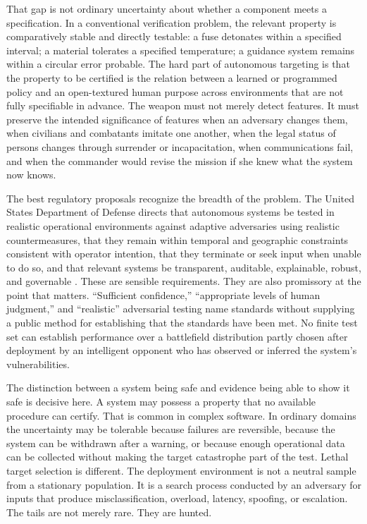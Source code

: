 \documentclass[11pt]{article}
\begin{document}
That gap is not ordinary uncertainty about whether a component meets a specification. In a conventional verification problem, the relevant property is comparatively stable and directly testable: a fuse detonates within a specified interval; a material tolerates a specified temperature; a guidance system remains within a circular error probable. The hard part of autonomous targeting is that the property to be certified is the relation between a learned or programmed policy and an open-textured human purpose across environments that are not fully specifiable in advance. The weapon must not merely detect features. It must preserve the intended significance of features when an adversary changes them, when civilians and combatants imitate one another, when the legal status of persons changes through surrender or incapacitation, when communications fail, and when the commander would revise the mission if she knew what the system now knows.

The best regulatory proposals recognize the breadth of the problem. The United States Department of Defense directs that autonomous systems be tested in realistic operational environments against adaptive adversaries using realistic countermeasures, that they remain within temporal and geographic constraints consistent with operator intention, that they terminate or seek input when unable to do so, and that relevant systems be transparent, auditable, explainable, robust, and governable \citep{dod2023}. These are sensible requirements. They are also promissory at the point that matters. ``Sufficient confidence,'' ``appropriate levels of human judgment,'' and ``realistic'' adversarial testing name standards without supplying a public method for establishing that the standards have been met. No finite test set can establish performance over a battlefield distribution partly chosen after deployment by an intelligent opponent who has observed or inferred the system's vulnerabilities.

The distinction between a system being safe and evidence being able to show it safe is decisive here. A system may possess a property that no available procedure can certify. That is common in complex software. In ordinary domains the uncertainty may be tolerable because failures are reversible, because the system can be withdrawn after a warning, or because enough operational data can be collected without making the target catastrophe part of the test. Lethal target selection is different. The deployment environment is not a neutral sample from a stationary population. It is a search process conducted by an adversary for inputs that produce misclassification, overload, latency, spoofing, or escalation. The tails are not merely rare. They are hunted.
\end{document}
